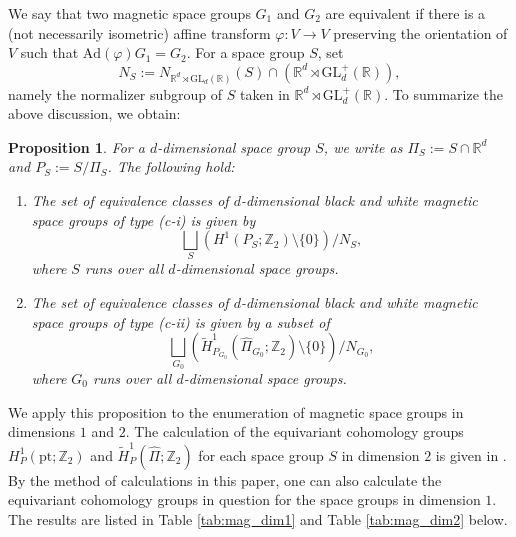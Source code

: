 \documentclass[11pt]{amsart}
\theoremstyle{definition}
\theoremstyle{plain}
\newtheorem{prp}[equation]{Proposition}
\theoremstyle{remark}
\newcommand{\bR}{\mathbb{R}}
\newcommand{\bZ}{\mathbb{Z}}
\begin{document}
We say that two magnetic space groups $G_1$ and $G_2$ are equivalent if there is a (not necessarily isometric) affine transform $\varphi \colon V \to V$ preserving the orientation of $V$ such that $\mathrm{Ad}(\varphi) G_1 =G_2$. 
For a space group $S$, set 
\[ N_S:=N_{\bR^d \rtimes \mathrm{GL}_d(\bR)}(S) \cap (\bR^d \rtimes \mathrm{GL}_d^+(\bR)),\]
namely the normalizer subgroup of $S$ taken in $\bR^d \rtimes \mathrm{GL}_d^+(\bR)$. To summarize the above discussion, we obtain:
\begin{prp}
For a $d$-dimensional space group $S$, we write as $\Pi_S:=S \cap \bR^d$ and $P_S:=S/\Pi_S$. The following hold:
\begin{enumerate}
\item The set of equivalence classes of $d$-dimensional black and white magnetic space groups of type (c-i) is given by
\[\bigsqcup_S (H^1(P_{S};\bZ_2) \setminus \{0\})/N_S,\]
where $S$ runs over all $d$-dimensional space groups. 
\item The set of equivalence classes of $d$-dimensional black and white magnetic space groups of type (c-ii) is given by a subset of
\[\bigsqcup_{G_0} (\tilde{H}^1_{P_{G_0}}(\hat{\Pi}_{G_0};\bZ_2) \setminus \{0\})/N_{G_0}, \]
where $G_0$ runs over all $d$-dimensional space groups. 
\end{enumerate}
\end{prp}

We apply this proposition to the enumeration of magnetic space groups in dimensions $1$ and $2$. The calculation of the equivariant cohomology groups $H^1_P(\mathrm{pt}; \bZ_2)$ and $\tilde{H}^1_P(\hat{\Pi}; \bZ_2)$ for each space group $S$ in dimension $2$ is given in \cite{gomiTwistsTorusEquivariant2017}. By the method of calculations in this paper, one can also calculate the equivariant cohomology groups in question for the space groups in dimension $1$.  The results are listed in Table \ref{tab:mag_dim1} and Table \ref{tab:mag_dim2} below. 
\end{document}
